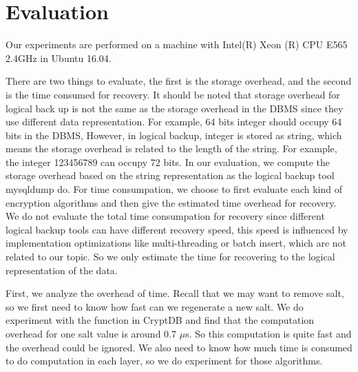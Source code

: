 
\section{Evaluation}

Our experiments are performed on a machine with Intel(R) Xeon (R) CPU E565 2.4GHz in Ubuntu 16.04. 


There are two things to evaluate, the first is the storage overhead, and the second is the time consumed for recovery. It should be noted that storage overhead for logical back up is not the same as the storage overhead in the DBMS since they use different data representation. For example, 64 bits integer should occupy 64 bits in the DBMS, However, in logical backup, integer is stored as string, which means the storage overhead is related to the length of the string. For example, the integer 123456789 can occupy 72 bits. In our evaluation, we compute the storage overhead based on the string representation as the logical backup tool mysqldump do. For time consumpation, we choose to first evaluate each kind of encryption algorithms and then give the estimated time overhead for recovery. We do not evaluate the total time consumpation for recovery since different logical backup tools can have different recovery speed, this speed is influenced by implementation optimizations like multi-threading or batch insert, which are not related to our topic. So we only estimate the time for recovering to the logical representation of the data. 


First, we analyze the overhead of time.  Recall that we may want to remove salt, so we first need to know how fast can we regenerate a new salt. We do experiment with the function in CryptDB and find that the computation overhead for one salt value is around 0.7 $\mu$s. So this computation is quite fast and the overhead could be ignored. We also need to know how much time is consumed to do computation in each layer, so we do experiment for those algorithms.


